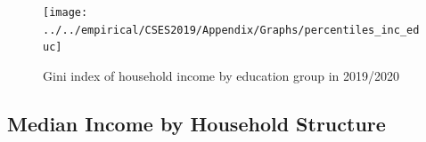 \documentclass[11pt,letterpaper]{article}
\begin{document}
\begin{figure}
	\centering
		\caption{Gini index of household income by education group in 2019/2020}
	\label{fig:app20}
		\vspace{-1em}
	\texttt{[image: ../../empirical/CSES2019/Appendix/Graphs/percentiles\_inc\_educ]}

\end{figure}


\subsection{Median Income by Household Structure}
\end{document}
